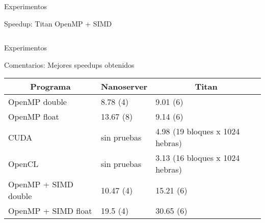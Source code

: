 \begin{frame}{Experimentos}
\begin{block}{Speedup: Titan OpenMP + SIMD}

\begin{columns}
  \begin{column}{.50\textwidth}
	\centerline{
      }

  \end{column}
  \begin{column}{.50\textwidth}
    \centerline{
      }
  \end{column}
  \end{columns}
\end{block}
\end{frame}
\begin{frame}{Experimentos}
\begin{block}{Comentarios: Mejores speedups obtenidos}

\begin{table}[htbp]\small
\centering
\label{tabla:resumenspeedups}
\begin{tabular}{lll}
\toprule
\multicolumn{1}{c}{{\bf Programa}} & \multicolumn{1}{c}{{\bf Nanoserver}} & \multicolumn{1}{c}{{\bf Titan}} \\
\midrule
OpenMP double & 8.78 (4) & 9.01 (6) \\
OpenMP float & 13.67 (8) & 9.14 (6) \\
CUDA & sin pruebas & 4.98 (19 bloques x 1024 hebras) \\
OpenCL & sin pruebas & 3.13 (16 bloques x 1024 hebras) \\
OpenMP + SIMD double & 10.47 (4) & 15.21 (6) \\
OpenMP + SIMD float & 19.5 (4) & 30.65 (6) \\
\bottomrule
\end{tabular}
\end{table}

\end{block}
\end{frame}

